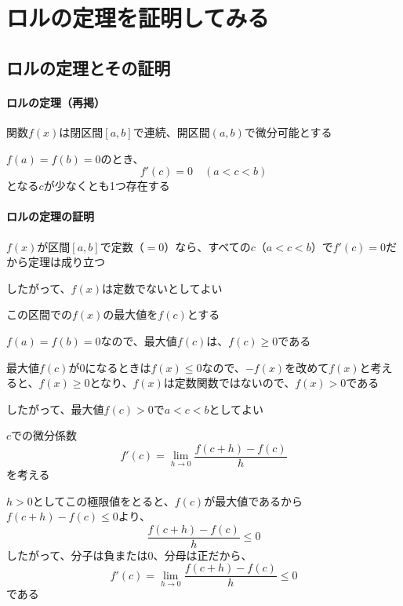 \documentclass[../book_infinite_continuous_math]{subfiles}
\begin{document}
\section{ロルの定理を証明してみる}

\subsection{ロルの定理とその証明}

\begin{oframed}
  \paragraph{ロルの定理（再掲）}
  関数$f(x)$は閉区間$[a, b]$で連続、開区間$(a, b)$で微分可能とする

  $f(a) = f(b)=0$のとき、
  \begin{equation*}
    f'(c) = 0 \quad (a < c < b)
  \end{equation*}
  となる$c$が少なくとも1つ存在する
\end{oframed}

\paragraph{ロルの定理の証明}\quad

$f(x)$が区間$[a, b]$で定数（$=0$）なら、すべての$c$（$a < c < b$）で$f'(c) = 0$だから定理は成り立つ

したがって、$f(x)$は定数でないとしてよい

\br

この区間での$f(x)$の最大値を$f(c)$とする

$f(a) = f(b) = 0$なので、最大値$f(c)$は、$f(c) \geq 0$である

最大値$f(c)$が$0$になるときは$f(x) \leq 0$なので、$-f(x)$を改めて$f(x)$と考えると、$f(x) \geq 0$となり、$f(x)$は定数関数ではないので、$f(x) > 0$である

したがって、最大値$f(c) > 0$で$a < c < b$としてよい

\br

$c$での微分係数
\begin{equation*}
  f'(c) = \lim_{h \to 0} \dfrac{f(c+h) - f(c)}{h}
\end{equation*}
を考える

$h >0$としてこの極限値をとると、$f(c)$が最大値であるから$f(c+h) - f(c) \leq 0$より、
\begin{equation*}
  \dfrac{f(c+h) - f(c)}{h} \leq 0
\end{equation*}
したがって、分子は負または$0$、分母は正だから、
\begin{equation*}
  f'(c) = \lim_{h \to 0} \dfrac{f(c+h) - f(c)}{h} \leq 0
\end{equation*}
である
\end{document}
